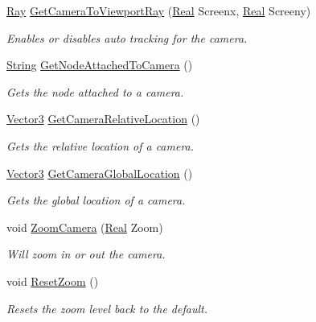 \begin{DoxyCompactItemize}
\hyperlink{classphys_1_1Ray}{Ray} \hyperlink{classphys_1_1Camera_a47c437c8755301512c2757f879e03e73}{GetCameraToViewportRay} (\hyperlink{namespacephys_af7eb897198d265b8e868f45240230d5f}{Real} Screenx, \hyperlink{namespacephys_af7eb897198d265b8e868f45240230d5f}{Real} Screeny)
\begin{DoxyCompactList}\small\item\em Enables or disables auto tracking for the camera. \item\end{DoxyCompactList}\item 
\hyperlink{namespacephys_aa03900411993de7fbfec4789bc1d392e}{String} \hyperlink{classphys_1_1Camera_ab32a8c708e5e22f65dde9ab821ea20fc}{GetNodeAttachedToCamera} ()
\begin{DoxyCompactList}\small\item\em Gets the node attached to a camera. \item\end{DoxyCompactList}\item 
\hyperlink{classphys_1_1Vector3}{Vector3} \hyperlink{classphys_1_1Camera_a771fc7005191c3f83ac1fedb09699943}{GetCameraRelativeLocation} ()
\begin{DoxyCompactList}\small\item\em Gets the relative location of a camera. \item\end{DoxyCompactList}\item 
\hyperlink{classphys_1_1Vector3}{Vector3} \hyperlink{classphys_1_1Camera_a53b61b6c163270ffb4f46eb66a973b10}{GetCameraGlobalLocation} ()
\begin{DoxyCompactList}\small\item\em Gets the global location of a camera. \item\end{DoxyCompactList}\item 
void \hyperlink{classphys_1_1Camera_a1cb593d12be4e6e1e51cb8f74ce2d97c}{ZoomCamera} (\hyperlink{namespacephys_af7eb897198d265b8e868f45240230d5f}{Real} Zoom)
\begin{DoxyCompactList}\small\item\em Will zoom in or out the camera. \item\end{DoxyCompactList}\item 
void \hyperlink{classphys_1_1Camera_a181465e6add36c07a63fdd26aee7c69a}{ResetZoom} ()
\begin{DoxyCompactList}\small\item\em Resets the zoom level back to the default. \item\end{DoxyCompactList}\end{DoxyCompactItemize}
